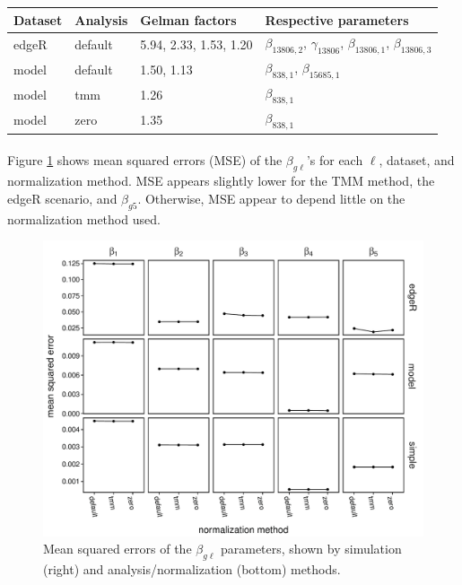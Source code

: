 \documentclass{article}
\begin{document}
\begin{flushleft}
\begin{table}[htbp]
   \centering
   \begin{tabular}{l|l|l|l}
     Dataset & Analysis & Gelman factors & Respective parameters \\ \hline
     edgeR & default & 5.94, 2.33, 1.53, 1.20 & $\beta_{13806, 2}$, $\gamma_{13806}$, $\beta_{13806, 1}$, $\beta_{13806, 3}$ \\
     model & default & 1.50, 1.13 & $\beta_{838, 1}$, $\beta_{15685, 1}$ \\
     model & tmm & 1.26 & $\beta_{838, 1}$ \\
     model & zero & 1.35 & $\beta_{838, 1}$
   \end{tabular}
   \label{tab:gelman}
\end{table}

\paragraph{} Figure \ref{fig:mse} shows mean squared errors (MSE) of the $\beta_{g\ell}$'s for each $\ell$, dataset, and normalization method. MSE appears slightly lower for the TMM method, the edgeR scenario, and $\beta_{g5}$. Otherwise, MSE appear to depend little on the normalization method used.

\begin{figure}[htbp]
   \centering
   \includegraphics[scale=0.5]{mse}
   \caption{Mean squared errors of the $\beta_{g\ell}$ parameters, shown by simulation (right) and analysis/normalization (bottom) methods.}
   \label{fig:mse}
\end{figure}


\end{flushleft}
\end{document}
